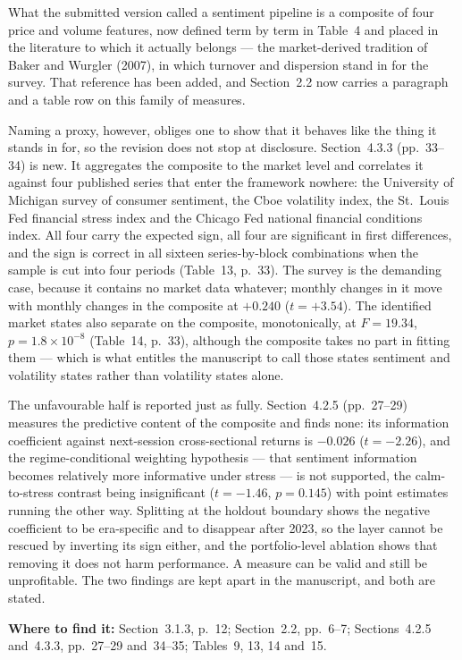 \documentclass[11pt,a4paper]{article}
\newcommand{\where}[1]{\par\smallskip\noindent\textcolor{blue!55!black}{\textbf{Where to find it:} #1}\par}
\begin{document}
What the submitted version called a sentiment pipeline is a composite of four price and
volume features, now defined term by term in Table~4 and placed in the literature to which
it actually belongs --- the market-derived tradition of Baker and Wurgler (2007), in which
turnover and dispersion stand in for the survey. That reference has been added, and
Section~2.2 now carries a paragraph and a table row on this family of measures.

Naming a proxy, however, obliges one to show that it behaves like the thing it stands in
for, so the revision does not stop at disclosure. Section~4.3.3 (pp.~33--34) is new. It
aggregates the composite to the market level and correlates it against four published
series that enter the framework nowhere: the University of Michigan survey of consumer
sentiment, the Cboe volatility index, the St.~Louis Fed financial stress index and the
Chicago Fed national financial conditions index. All four carry the expected sign, all four
are significant in first differences, and the sign is correct in all sixteen
series-by-block combinations when the sample is cut into four periods (Table~13, p.~33).
The survey is the demanding case, because it contains no market data whatever; monthly
changes in it move with monthly changes in the composite at $+0.240$ ($t = +3.54$). The
identified market states also separate on the composite, monotonically, at $F = 19.34$,
$p = 1.8 \times 10^{-8}$ (Table~14, p.~33), although the composite takes no part in fitting
them --- which is what entitles the manuscript to call those states sentiment and
volatility states rather than volatility states alone.

The unfavourable half is reported just as fully. Section~4.2.5 (pp.~27--29) measures the
predictive content of the composite and finds none: its information coefficient against
next-session cross-sectional returns is $-0.026$ ($t = -2.26$), and the regime-conditional
weighting hypothesis --- that sentiment information becomes relatively more informative
under stress --- is not supported, the calm-to-stress contrast being insignificant
($t = -1.46$, $p = 0.145$) with point estimates running the other way. Splitting at the
holdout boundary shows the negative coefficient to be era-specific and to disappear after
2023, so the layer cannot be rescued by inverting its sign either, and the portfolio-level
ablation shows that removing it does not harm performance. A measure can be valid and still
be unprofitable. The two findings are kept apart in the manuscript, and both are stated.
\where{Section~3.1.3, p.~12; Section~2.2, pp.~6--7; Sections~4.2.5 and~4.3.3, pp.~27--29
and~34--35; Tables~9, 13, 14 and~15.}
\end{document}
